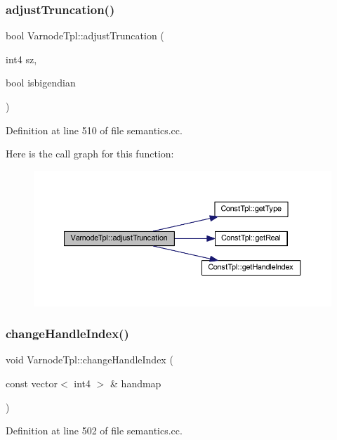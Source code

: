 \subsubsection{\texorpdfstring{adjustTruncation()}{adjustTruncation()}}
{\footnotesize\ttfamily bool Varnode\+Tpl\+::adjust\+Truncation (\begin{DoxyParamCaption}\item[{int4}]{sz,  }\item[{bool}]{isbigendian }\end{DoxyParamCaption})}



Definition at line 510 of file semantics.\+cc.

Here is the call graph for this function\+:
\nopagebreak
\begin{figure}[H]
\begin{center}
\leavevmode
\includegraphics[width=350pt]{class_varnode_tpl_a667fba2ee7a49e3ef4ba3b82e4200048_cgraph}
\end{center}
\end{figure}
\mbox{\label{class_varnode_tpl_a2cd82b00a027189ff761b0d6db930ea6}} 
\subsubsection{\texorpdfstring{changeHandleIndex()}{changeHandleIndex()}}
{\footnotesize\ttfamily void Varnode\+Tpl\+::change\+Handle\+Index (\begin{DoxyParamCaption}\item[{const vector$<$ int4 $>$ \&}]{handmap }\end{DoxyParamCaption})}



Definition at line 502 of file semantics.\+cc.


